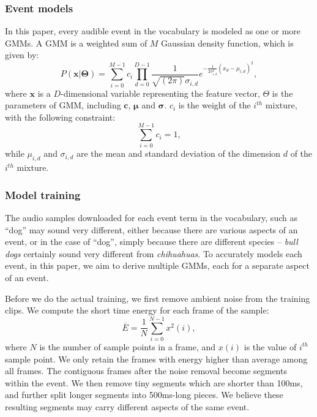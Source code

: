 
\subsubsection{Event models}
In this paper, every audible event in the vocabulary is modeled as one or
more GMMs. A GMM is a weighted sum of $M$ Gaussian density function, 
which is given by:
\begin{equation}
P(\mathbf{x}|\mathbf{\Theta}) = \sum_{i = 0}^{M - 1} c_i\prod_{d=0}^{D-1} \frac{1}{\sqrt{(2\pi)}\sigma_{i,d}}e^{-\frac{1}{2\sigma_{i,d}^{2}}(x_d-\mu_{i,d})^2},
\label{eqn:gmm}
\end{equation}
where $\mathbf{x}$ is a $D$-dimensional variable representing
the feature vector, $\Theta$ is the parameters of GMM, 
including $\mathbf{c}$, $\mathbf{\mu}$ and $\mathbf{\sigma}$.
$c_i$ is the weight of the $i^{th}$ mixture, with the following constraint:
\begin{equation}
\sum_{i=0}^{M-1}c_i=1,
\end{equation}
while $\mu_{i,d}$ and $\sigma_{i,d}$ are the mean and standard deviation 
of the dimension $d$ of the $i^{th}$ mixture.

\subsubsection{Model training}
The audio samples downloaded for each event term in the vocabulary, 
such as ``dog'' may sound very different, either because there are various
aspects of an event, or in the case of ``dog'', simply because there are
different species -- {\em bull dogs} certainly sound very 
different from {\em chihuahuas}.
To accurately models each event, in this paper, we aim to derive multiple
GMMs, each for a separate aspect of an event. 

Before we do the actual training, we first remove ambient noise from
the training clips. We compute the short time energy for each frame
of the sample:
\begin{equation}
\overline{E} = \frac{1}{N}\sum_{i=0}^{N-1}x^2(i),
\label{eqn:en}
\end{equation}
where $N$ is the number of sample points in a frame, 
and $x(i)$ is the value of $i^{th}$ sample point. 
We only retain the frames with energy higher than average among all
frames. The contiguous frames after the noise removal become segments
within the event. We then remove tiny segments which are shorter than 100ms,
and further split longer segments into 500ms-long pieces.
We believe these resulting segments may carry different
aspects of the same event.

